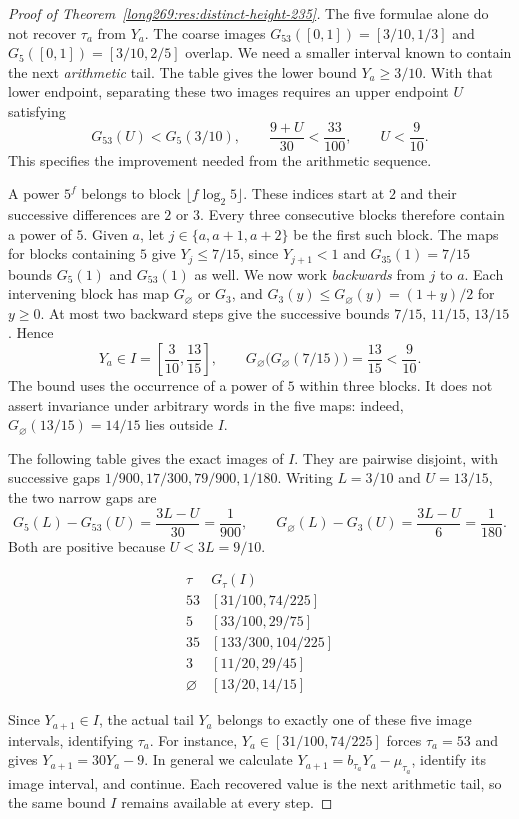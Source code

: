 \documentclass[11pt]{article}
\theoremstyle{remark}
\theoremstyle{plain}
\begin{document}
\begin{proof}[Proof of Theorem~\ref{long269:res:distinct-height-235}]
The five formulae alone do not recover $\tau_a$ from $Y_a$.
The coarse images $G_{53}([0,1])=[3/10,1/3]$ and
$G_5([0,1])=[3/10,2/5]$ overlap. We need a smaller interval known to
contain the next \emph{arithmetic} tail. The table gives the lower bound
$Y_a\ge3/10$. With that lower endpoint, separating these two images
requires an upper endpoint $U$ satisfying
\[
 G_{53}(U)<G_5(3/10),\qquad
 \frac{9+U}{30}<\frac{33}{100},\qquad U<\frac9{10}.
\]
This specifies the improvement needed from the arithmetic sequence.

A power $5^f$ belongs to block $\lfloor f\log_2 5\rfloor$. These
indices start at $2$ and their successive differences are $2$ or $3$.
Every three consecutive blocks therefore contain a power of $5$.
Given $a$, let $j\in\{a,a+1,a+2\}$ be the first such block. The maps
for blocks containing $5$ give $Y_j\le7/15$, since $Y_{j+1}<1$ and
$G_{35}(1)=7/15$ bounds $G_5(1)$ and $G_{53}(1)$ as well.
We now work \emph{backwards} from $j$ to $a$. Each intervening block
has map $G_\varnothing$ or $G_3$, and
$G_3(y)\le G_\varnothing(y)=(1+y)/2$ for $y\ge0$.
At most two backward steps give the successive bounds
$7/15$, $11/15$, $13/15$. Hence
\begin{equation}\label{long269:eq:five-interval}
 Y_a\in I=\left[\frac3{10},\frac{13}{15}\right],\qquad
 G_\varnothing\bigl(G_\varnothing(7/15)\bigr)=\frac{13}{15}<\frac9{10}.
\end{equation}
The bound uses the occurrence of a power of $5$ within three blocks.
It does not assert invariance under arbitrary words in the five maps:
indeed, $G_\varnothing(13/15)=14/15$ lies outside $I$.

The following table gives the exact images of $I$. They
are pairwise disjoint, with successive gaps
$1/900,17/300,79/900,1/180$. Writing $L=3/10$ and $U=13/15$, the two
narrow gaps are
\[
 G_5(L)-G_{53}(U)=\frac{3L-U}{30}=\frac1{900},\qquad
 G_\varnothing(L)-G_3(U)=\frac{3L-U}{6}=\frac1{180}.
\]
Both are positive because $U<3L=9/10$.

\[
 \begin{array}{c|c}
 \tau&G_\tau(I)\\\hline
 53&[31/100,74/225]\\
 5&[33/100,29/75]\\
 35&[133/300,104/225]\\
 3&[11/20,29/45]\\
 \varnothing&[13/20,14/15]
 \end{array}
\]

Since $Y_{a+1}\in I$, the actual tail $Y_a$ belongs to exactly one of
these five image intervals, identifying $\tau_a$. For instance,
$Y_a\in[31/100,74/225]$ forces $\tau_a=53$ and gives $Y_{a+1}=30Y_a-9$.
In general we calculate $Y_{a+1}=b_{\tau_a}Y_a-\mu_{\tau_a}$, identify its
image interval, and continue. Each recovered value is the next arithmetic
tail, so the same bound $I$ remains available at every step.


\end{proof}
\end{document}
